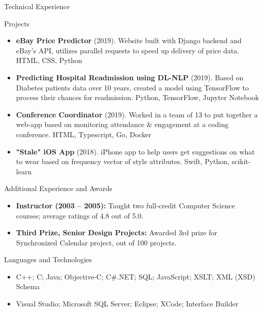\documentclass[]{mcdowellcv}
\begin{document}
	\begin{cvsection}{Technical Experience}
		\begin{cvsubsection}{Projects}{}{}
			\begin{itemize}
				\item \textbf{eBay Price Predictor} (2019). Website built with Django backend and eBay's API, utilizes parallel requests to speed up delivery of price data.  HTML, CSS, Python
				\item \textbf{Predicting Hospital Readmission using DL-NLP} (2019). Based on Diabetes patients data over 10 years, created a model using TensorFlow to process their chances for readmission. Python, TensorFlow, Jupyter Notebook
				\item \textbf{Conference Coordinator} (2019). Worked in a team of 13 to put together a web-app based on monitoring attendance \& engagement at a coding conference.  HTML, Typescript, Go, Docker
				\item \textbf{"Stale" iOS App} (2018).  iPhone app to help users get suggestions on what to wear based on frequency vector of style attributes. Swift, Python, scikit-learn
			\end{itemize}
		\end{cvsubsection}
	\end{cvsection}
	
	\begin{cvsection}{Additional Experience and Awards}
		\begin{cvsubsection}{}{}{}	
			\begin{itemize}
				\item \textbf{Instructor (2003 – 2005):} Taught two full-credit Computer Science courses; average ratings of 4.8 out of 5.0.
				\item \textbf{Third Prize, Senior Design Projects:} Awarded 3rd prize for Synchronized Calendar project, out of 100 projects.
			\end{itemize}
		\end{cvsubsection}
	\end{cvsection}
	
	\begin{cvsection}{Languages and Technologies}
		\begin{cvsubsection}{}{}{}	
			\begin{itemize}
				\item C++; C; Java; Objective-C; C\#.NET; SQL; JavaScript; XSLT; XML (XSD) Schema 
				\item Visual Studio; Microsoft SQL Server; Eclipse; XCode; Interface Builder
			\end{itemize}
		\end{cvsubsection}
	\end{cvsection}
	
\end{document}
